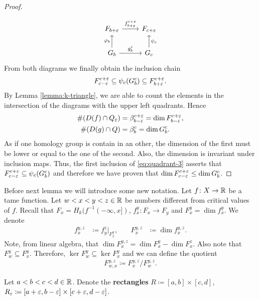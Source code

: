 \begin{proof}
\begin{align}
    \end{align}
    \begin{equation} \label{cd:quadrant-2}
    \begin{tikzcd}
        F_{b+\e} \arrow[r, "f_{b+\e}^{c+\e}"]
        & F_{c+\e} \\
        G_b \arrow[r, "g_b^c"] \arrow[u, "\varphi_{b}"]
        & G_c \arrow[u, "\psi_c"']        
    \end{tikzcd}
    \end{equation}
    From both diagrams we finally obtain the inclusion chain
    \begin{align}  \label{eq:quadrant-3}
        F_{c-\varepsilon}^{c+\varepsilon} \subseteq \psi_c (G_b^c) \subseteq F_{b+\varepsilon}^{c+\varepsilon}.
    \end{align}
    By Lemma \ref{lemma:k-triangle}, we are able to count the elements in the intersection of the diagrams with the upper left quadrants. Hence
    \begin{align}
        \#(D(f) \cap Q_\varepsilon) &= \beta_{b-\varepsilon}^{c+\varepsilon} = \dim F_{b-\varepsilon}^{c+\varepsilon}, \\
        \#(D(g) \cap Q) &= \beta_b^c = \dim G_b^c.
    \end{align}
    As if one homology group is contain in an other, the dimension of the first must be lower or equal to the one of the second. Also, the dimension is invariant under inclusion maps. Thus, the first inclusion of \eqref{eq:quadrant-3} asserts that $ F_{c-\varepsilon}^{c+\varepsilon} \subseteq \psi_c (G_b^c) $ and therefore we have proven that $ \dim F_{c-\varepsilon}^{c+\varepsilon} \leq  \dim G_b^c $.
\end{proof}

Before next lemma we will introduce some new notation. Let $ f\colon X \to \mathbb R $ be a tame function. Let $ w < x < y < z \in \mathbb R $ be numbers different from critical values of $ f $. Recall that $ F_x = H_k(f^{-1}(-\infty, x]) $, $ f_x^y \colon F_x \to F_y $ and $ F_x^y = \dim f_x^y $. We denote
\begin{align}
    f_x^{y, z} &\coloneq f_y^z \rvert_{F_x^y},
    \quad &
    F_x^{y, z} &\coloneq \dim f_x^{y, z}.
\end{align}
Note, from linear algebra, that $ \dim F_x^{y,z} = \dim F_x^y - \dim F_x^z $. Also note that $ F_w^y \subseteq F_x^y $. Therefore, $ \ker F_w^y \subseteq \ker F_x^y $ and we can define the quotient
\begin{align}
    F_{w,x}^{y,z} \coloneq F_x^{y,z} / F_w^{y,z}.
\end{align}

Let $ a < b < c < d \in \mathbb R $. Denote the {\bf rectangles} $ R \coloneq [a, b] \times [c, d] $, $ R_\varepsilon \coloneq [a+\varepsilon, b-\varepsilon] \times [c+\varepsilon, d -\varepsilon] $.

